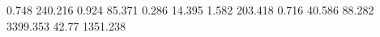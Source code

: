 0.748      240.216    %
0.924      85.371     %
0.286      14.395     %
1.582      203.418    %
0.716      40.586     %
88.282     3399.353   %
42.77      1351.238   %

